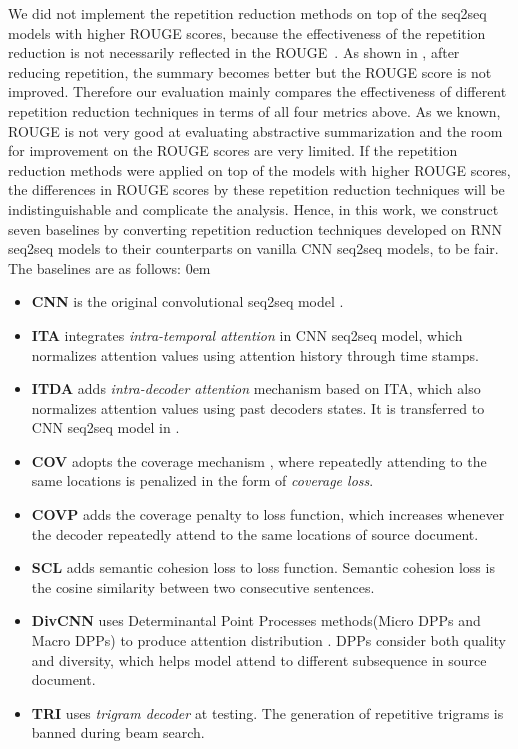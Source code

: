 We did not implement the repetition reduction methods 
on top of the seq2seq models with higher ROUGE scores,
because the effectiveness of the repetition reduction is not necessarily
reflected in the ROUGE~\citep{SeeLM17, PaulusXS17, FanGA18}.
As shown in , 
after reducing repetition, the summary becomes better
but the ROUGE score is not improved. 
Therefore our evaluation mainly compares
the effectiveness of different repetition reduction techniques
in terms of all four metrics above.
As we known, ROUGE is not very good at evaluating abstractive summarization
and the room for improvement on the ROUGE scores are very limited.
If the repetition reduction methods 
were applied on top of the models with higher ROUGE scores, 
the differences in ROUGE scores by these repetition reduction techniques will be
indistinguishable and complicate the analysis. 
Hence, in this work, 
we construct seven baselines 
by converting
repetition reduction techniques developed on RNN seq2seq models to their
counterparts on vanilla CNN seq2seq models,
to be fair.
The baselines are as follows:
\itemsep0em
\begin{itemize}
\item \textbf{CNN} is the original convolutional seq2seq model \citep{gehring2017convs2s}. 
\item \textbf{ITA} integrates \textit{intra-temporal attention} \citep{NallapatiZSGX16} in CNN seq2seq model, which normalizes attention values using attention history through time stamps. 
\item \textbf{ITDA} adds \textit{intra-decoder attention} mechanism \citep{PaulusXS17} based on ITA,
which also normalizes attention values using past decoders states.
It is transferred to CNN seq2seq model in \citep{FanGA18}.
\item \textbf{COV} adopts the coverage mechanism \citep{SeeLM17}, where repeatedly
attending to the same locations is penalized in the form of \textit{coverage loss}. 
\item \textbf{COVP} adds the coverage penalty \citep{GehrmannDR18} to loss function,
which increases whenever the decoder repeatedly attend to the same locations of source document.
\item \textbf{SCL} adds semantic cohesion loss \citep{elikyilmazBHC18} to loss function.
Semantic cohesion loss is the cosine similarity between two consecutive sentences.
\item \textbf{DivCNN} uses Determinantal Point Processes methods(Micro DPPs and
Macro DPPs) to produce attention distribution \citep{DivC2C19}. DPPs consider both quality and diversity, which helps model attend to different subsequence in source document.
\item \textbf{TRI} uses \textit{trigram decoder} \citep{PaulusXS17} at testing. The generation of repetitive trigrams is banned during beam search.
\end{itemize}

